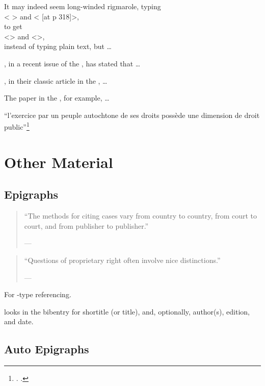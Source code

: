 It may indeed seem long-winded rigmarole, typing\\
<  > and < [at p 318]>,\\ to get\\ <> and <>,\\ instead of typing plain text, but \ldots

, in a recent issue of the , has stated that \ldots

, in their classic article in the , \ldots

The  paper in the , for example, \ldots
\bigskip

``l’exercice par un peuple autochtone de
ses droits possède une dimension de droit public''\footnote{\ljcite[\protect\label{cfn:otis}][at p 456]{otis}. .}


\section{Other Material}
\subsection{Epigraphs}
\begin{quotation}
\noindent ``The methods for citing cases vary from country to country, from court to court, and from publisher to publisher.''

 \hfill --- 
\end{quotation}

\begin{quotation}
\noindent ``Questions of proprietary right often involve nice distinctions.''

 \hfill --- 
\end{quotation}

For -type referencing. %
\bigskip

 looks in the bibentry for shortitle (or title), and, optionally, author(s), edition, and date.


\subsection{Auto Epigraphs}

